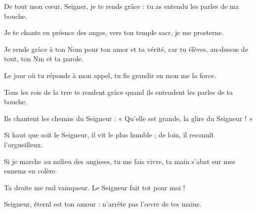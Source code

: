 \item De tout mon cœur, Seigner, je te rends grâce :\psstar{} tu as entendu les parles de ma bouche.
\item Je te chante en présnce des anges,\psstar{} vers ton temple sacr, je me prosterne.
\item Je rends grâce à ton Nom pour ton amor et ta vérité,\psstar{} car tu élèves, au-dessus de tout, ton Nm et ta parole.
\item Le jour où tu réponds à mon appel,\psstar{} tu fis grandir en mon me la force.
\item Tous les rois de la trre te rendent grâce\psstar{} quand ils entendent les parles de ta bouche.
\item Ils chantent les chemns du Seigneur :\psstar{} « Qu’elle est grande, la glire du Seigneur ! »
\item Si haut que soit le Seigneur, il vit le plus humble ;\psstar{} de loin, il reconnît l’orgueilleux.
\item Si je marche au milieu des angisses, tu me fais vivre,\psstar{} ta main s’abat sur mes ennems en colère.
\item Ta droite me rnd vainqueur.\psstar{} Le Seigneur fait tot pour moi !
\item Seigneur, éternl est ton amour :\psstar{} n’arrête pas l’œvre de tes mains.